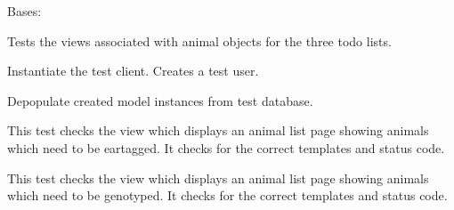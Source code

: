 \documentclass[letterpaper,10pt,english]{sphinxmanual}
\begin{document}

\begin{fulllineitems}
\label{api:mousedb.animal.tests.ToDoViewTests}
Bases: 

Tests the views associated with animal objects for the three todo lists.


\begin{fulllineitems}
\label{api:mousedb.animal.tests.ToDoViewTests.setUp}
Instantiate the test client.  Creates a test user.

\end{fulllineitems}



\begin{fulllineitems}
\label{api:mousedb.animal.tests.ToDoViewTests.tearDown}
Depopulate created model instances from test database.

\end{fulllineitems}



\begin{fulllineitems}
\label{api:mousedb.animal.tests.ToDoViewTests.test_eartag_list}
This test checks the view which displays an animal list page showing animals which need to be eartagged.  It checks for the correct templates and status code.

\end{fulllineitems}



\begin{fulllineitems}
\label{api:mousedb.animal.tests.ToDoViewTests.test_genotype_list}
This test checks the view which displays an animal list page showing animals which need to be genotyped.  It checks for the correct templates and status code.


\end{fulllineitems}
\end{fulllineitems}
\end{document}
